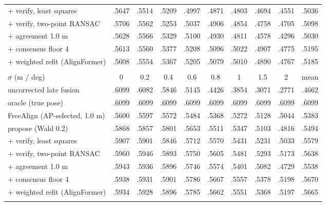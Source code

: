 \begin{table}[t]
\begin{tabular}{lccccccccc}
    + verify, least squares & .5647 & .5514 & .5209 & .4997 & .4871 & .4803 & .4694 & .4551 & .5036 \\
    + verify, two-point RANSAC & .5706 & .5562 & .5253 & .5037 & .4906 & .4854 & .4758 & .4705 & .5098 \\
    + agreement 1.0 m & .5628 & .5566 & .5329 & .5100 & .4930 & .4811 & .4578 & .4296 & .5030 \\
    + consensus floor 4 & .5613 & .5560 & .5377 & .5208 & .5096 & .5022 & .4907 & .4775 & .5195 \\
    + weighted refit (AlignFormer) & .5608 & .5554 & .5367 & .5205 & .5079 & .5010 & .4890 & .4767 & .5185 \\
    \addlinespace
    \multicolumn{10}{l}{\textbf{AP@0.3}} \\
    $\sigma$ (m / deg) & 0 & 0.2 & 0.4 & 0.6 & 0.8 & 1 & 1.5 & 2 & mean \\
    \midrule
    uncorrected late fusion & .6099 & .6082 & .5846 & .5145 & .4426 & .3854 & .3071 & .2771 & .4662 \\
    oracle (true pose) & .6099 & .6099 & .6099 & .6099 & .6099 & .6099 & .6099 & .6099 & .6099 \\
    FreeAlign (AP-selected, 1.0 m) & .5600 & .5597 & .5572 & .5484 & .5368 & .5272 & .5128 & .5044 & .5383 \\
    \midrule
    propose (Wald 0.2) & .5868 & .5857 & .5801 & .5653 & .5511 & .5347 & .5103 & .4816 & .5494 \\
    + verify, least squares & .5907 & .5901 & .5846 & .5712 & .5570 & .5431 & .5231 & .5033 & .5579 \\
    + verify, two-point RANSAC & .5960 & .5946 & .5893 & .5750 & .5605 & .5481 & .5293 & .5173 & .5638 \\
    + agreement 1.0 m & .5943 & .5936 & .5896 & .5746 & .5574 & .5401 & .5082 & .4729 & .5538 \\
    + consensus floor 4 & .5938 & .5931 & .5901 & .5786 & .5667 & .5557 & .5378 & .5198 & .5670 \\
    + weighted refit (AlignFormer) & .5934 & .5928 & .5896 & .5785 & .5662 & .5551 & .5368 & .5197 & .5665 \\
    \addlinespace
    \bottomrule
  \end{tabular}
\end{table}
